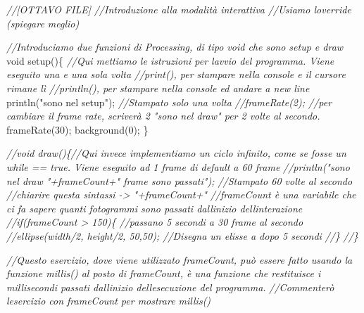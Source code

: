 \documentclass[
]{article}
\newenvironment{Shaded}{}{}
\newcommand{\CommentTok}[1]{\textcolor[rgb]{0.38,0.63,0.69}{\textit{#1}}}
\newcommand{\DataTypeTok}[1]{\textcolor[rgb]{0.56,0.13,0.00}{#1}}
\newcommand{\DecValTok}[1]{\textcolor[rgb]{0.25,0.63,0.44}{#1}}
\newcommand{\FunctionTok}[1]{\textcolor[rgb]{0.02,0.16,0.49}{#1}}
\newcommand{\OperatorTok}[1]{\textcolor[rgb]{0.40,0.40,0.40}{#1}}
\newcommand{\StringTok}[1]{\textcolor[rgb]{0.25,0.44,0.63}{#1}}
\begin{document}
\begin{Shaded}
\begin{Highlighting}[]
\CommentTok{//[OTTAVO FILE]}
\CommentTok{//Introduzione alla modalità interattiva}
\CommentTok{//Usiamo l\textquotesingle{}override (spiegare meglio)}

\CommentTok{//Introduciamo due funzioni di Processing, di tipo \textquotesingle{}void\textquotesingle{} che sono setup e draw}
\DataTypeTok{void} \FunctionTok{setup}\OperatorTok{()\{} \CommentTok{//Qui mettiamo le istruzioni per l\textquotesingle{}avvio del programma. Viene eseguito una e una sola  volta}
  \CommentTok{//\textquotesingle{}print()\textquotesingle{}, per stampare nella console e il cursore rimane lì}
  \CommentTok{//\textquotesingle{}println()\textquotesingle{}, per stampare nella console ed andare a new line}
  \FunctionTok{println}\OperatorTok{(}\StringTok{"sono nel setup"}\OperatorTok{);} \CommentTok{//Stampato solo una volta}
  \CommentTok{//frameRate(2); //per cambiare il frame rate, scriverà 2 "sono nel draw" per 2 volte al secondo.}
   \FunctionTok{frameRate}\OperatorTok{(}\DecValTok{30}\OperatorTok{);}
   \FunctionTok{background}\OperatorTok{(}\DecValTok{0}\OperatorTok{);}
\OperatorTok{\}}

\CommentTok{//void draw()\{//Qui invece implementiamo un ciclo infinito, come se fosse un while == true. Viene eseguito ad 1 frame di default a 60 frame}
  \CommentTok{//println("sono nel draw "+frameCount+" frame sono passati"); //Stampato 60 volte al secondo //chiarire questa sintassi {-}\textgreater{} "+frameCount+"}
  \CommentTok{//frameCount è una variabile che ci fa sapere quanti fotogrammi sono passati dall\textquotesingle{}inizio dell\textquotesingle{}interazione}
  \CommentTok{//if(frameCount \textgreater{} 150)\{ //passano 5 secondi a 30 frame al secondo}
    \CommentTok{//ellipse(width/2, height/2, 50,50); //Disegna un elisse a dopo 5 secondi}
  \CommentTok{//\}}
\CommentTok{//\}}

\CommentTok{//Questo esercizio, dove viene utilizzato frameCount, può essere fatto usando la funzione \textquotesingle{}millis()\textquotesingle{} al posto di frameCount, è una funzione che restituisce i millisecondi passati dall\textquotesingle{}inizio dell\textquotesingle{}esecuzione del programma.}
\CommentTok{//Commenterò l\textquotesingle{}esercizio con frameCount per mostrare millis()}


\end{Highlighting}
\end{Shaded}
\end{document}
